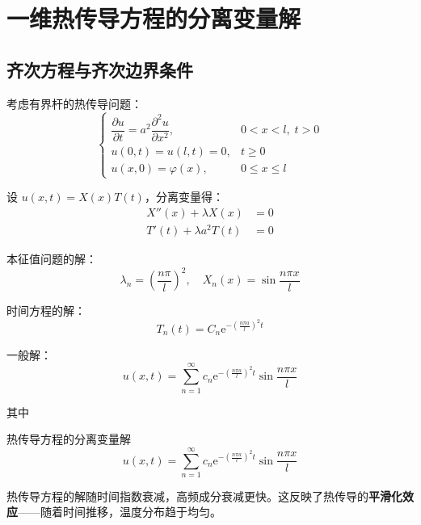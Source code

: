 \section{一维热传导方程的分离变量解}

\subsection{齐次方程与齐次边界条件}

考虑有界杆的热传导问题：
\begin{equation}
    \begin{cases}
        \dfrac{\partial u}{\partial t} = a^2\dfrac{\partial^2 u}{\partial x^2}, & 0 < x < l, \; t > 0 \\
        u(0, t) = u(l, t) = 0, & t \geq 0 \\
        u(x, 0) = \varphi(x), & 0 \leq x \leq l
    \end{cases}
\end{equation}

设 $u(x, t) = X(x)T(t)$，分离变量得：
\begin{align}
    X''(x) + \lambda X(x) &= 0 \\
    T'(t) + \lambda a^2 T(t) &= 0
    \end{align}

本征值问题的解：
\begin{equation}
    \lambda_n = \left(\frac{n\pi}{l}\right)^2, \quad X_n(x) = \sin\frac{n\pi x}{l}
\end{equation}

时间方程的解：
\begin{equation}
    T_n(t) = C_n\mathrm{e}^{-\left(\frac{n\pi a}{l}\right)^2 t}
\end{equation}

一般解：
\begin{equation}
    \boxed{u(x, t) = \sum_{n=1}^{\infty} c_n\mathrm{e}^{-\left(\frac{n\pi a}{l}\right)^2 t}\sin\frac{n\pi x}{l}}
\end{equation}

其中
\begin{dingli}{热传导方程的分离变量解}{}
\[
    u(x, t) = \sum_{n=1}^{\infty} c_n\mathrm{e}^{-\left(\frac{n\pi a}{l}\right)^2 t}\sin\frac{n\pi x}{l}
\]
\end{dingli}

\begin{tishi}[衰减特性]
热传导方程的解随时间指数衰减，高频成分衰减更快。这反映了热传导的\textbf{平滑化效应}——随着时间推移，温度分布趋于均匀。
\end{tishi}


